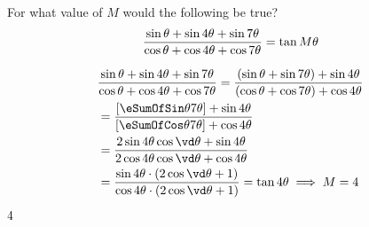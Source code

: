 
\SUBTRACT\vb\va\vd

\question[3] For what value of $M$ would the following be true? 
 \[ \dfrac{\sin\theta + \sin 4\theta + \sin 7\theta}
  	{\cos \theta + \cos 4\theta + \cos 7\theta} = \tan M\theta \]

\begin{solution}[\halfpage]
  \begin{align}
    &\dfrac{\sin\theta + \sin\va\theta + \sin\vb\theta}{\cos\theta + \cos\va\theta + \cos\vb\theta} = 
    \dfrac{(\sin\theta + \sin\vb\theta) + \sin\va\theta}{(\cos\theta + \cos\vb\theta) + \cos\va\theta} \\
    &= \dfrac{\left[ \eSumOfSin\theta{\vb\theta} \right] + \sin\va\theta}{\left[ \eSumOfCos\theta{\vb\theta}\right] + \cos\va\theta} \\
    &= \dfrac{2\sin\va\theta\cos\vd\theta + \sin\va\theta}{2\cos\va\theta\cos\vd\theta + \cos\va\theta} \\
    &= \dfrac{\sin\va\theta\cdot (2\cos\vd\theta + 1)}{\cos\va\theta\cdot (2\cos\vd\theta + 1)} = \tan\va\theta\implies M = \va
  \end{align}
\end{solution}

\ifprintanswers\begin{codex}$4$\end{codex}\fi
